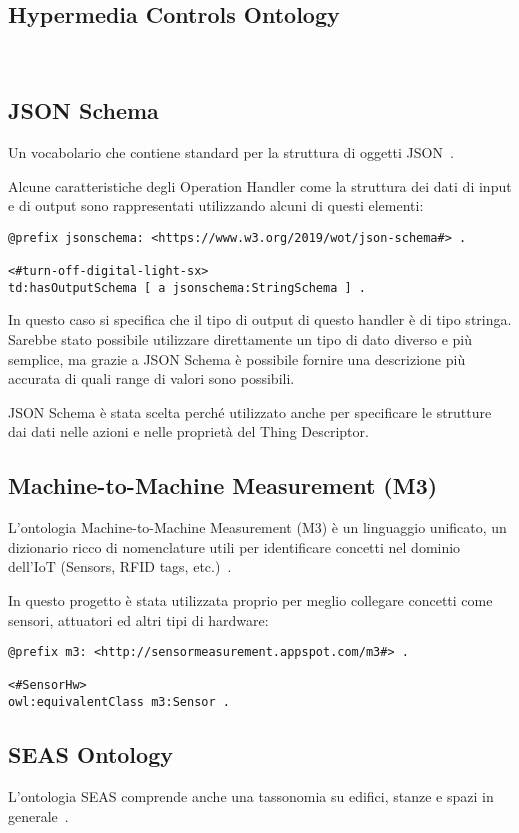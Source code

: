 \subsection{Hypermedia Controls Ontology}
~\cite{Hypermed84:online}
\subsection{JSON Schema}
Un vocabolario che contiene standard per la struttura di oggetti JSON~\cite{JSONSche6:online}.

\noindent Alcune caratteristiche degli Operation Handler come la struttura dei dati di input e di output sono rappresentati utilizzando alcuni di questi elementi:
\begin{verbatim}
@prefix jsonschema: <https://www.w3.org/2019/wot/json-schema#> .

<#turn-off-digital-light-sx>
td:hasOutputSchema [ a jsonschema:StringSchema ] .
\end{verbatim}
\noindent In questo caso si specifica che il tipo di output di questo handler è di tipo stringa. Sarebbe stato possibile utilizzare direttamente un tipo di dato diverso e più semplice, ma grazie a JSON Schema è possibile fornire una descrizione più accurata di quali range di valori sono possibili.

\noindent JSON Schema è stata scelta perché utilizzato anche per specificare le strutture dai dati nelle azioni e nelle proprietà del Thing Descriptor.


\subsection{Machine-to-Machine Measurement (M3)}
L'ontologia Machine-to-Machine Measurement (M3) è un linguaggio unificato, un dizionario ricco di nomenclature utili per identificare concetti nel dominio dell'IoT (Sensors, RFID tags, etc.)~\cite{SWoTSema18:online}.

\noindent In questo progetto è stata utilizzata proprio per meglio collegare concetti come sensori, attuatori ed altri tipi di hardware:

\begin{verbatim}
@prefix m3: <http://sensormeasurement.appspot.com/m3#> .

<#SensorHw>
owl:equivalentClass m3:Sensor .
\end{verbatim}

\subsection{SEAS Ontology}
L'ontologia SEAS comprende anche una tassonomia su edifici, stanze e spazi in generale~\cite{SEAS:online}.

